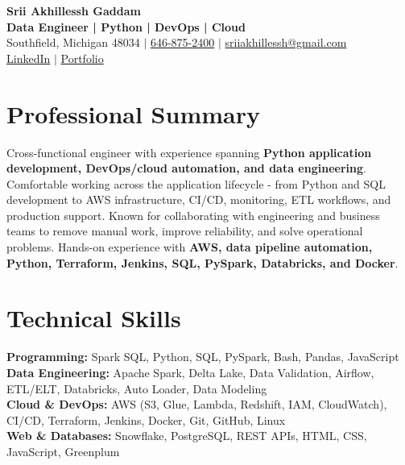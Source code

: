 \documentclass[letterpaper,10pt]{article}
\begin{document}
\fontsize{9.35pt}{10.45pt}\selectfont

\begin{center}
    {\LARGE \textbf{Srii Akhillessh Gaddam}} \\[-1pt]
    \textbf{Data Engineer | Python | DevOps | Cloud} \\[2pt]
    Southfield, Michigan 48034 $|$
    \href{tel:6468752400}{646-875-2400} $|$
    \href{mailto:sriiakhillessh@gmail.com}{sriiakhillessh@gmail.com} \\[1pt]
    \href{https://www.linkedin.com/in/srii-akhiilessh-gaddam-b48668191/}{LinkedIn} $|$
    \href{https://sriiakhillesshg.github.io/portfolio/}{Portfolio}
\end{center}
\vspace{-8pt}

\section{Professional Summary}
\small{Cross-functional engineer with experience spanning \textbf{Python application development, DevOps/cloud automation, and data engineering}. Comfortable working across the application lifecycle - from Python and SQL development to AWS infrastructure, CI/CD, monitoring, ETL workflows, and production support. Known for collaborating with engineering and business teams to remove manual work, improve reliability, and solve operational problems. Hands-on experience with \textbf{AWS, data pipeline automation, Python, Terraform, Jenkins, SQL, PySpark, Databricks, and Docker}.}

\section{Technical Skills}
\small{
\textbf{Programming:} Spark SQL, Python, SQL, PySpark, Bash, Pandas, JavaScript \\
\textbf{Data Engineering:} Apache Spark, Delta Lake, Data Validation, Airflow, ETL/ELT, Databricks, Auto Loader, Data Modeling \\
\textbf{Cloud \& DevOps:} AWS (S3, Glue, Lambda, Redshift, IAM, CloudWatch), CI/CD, Terraform, Jenkins, Docker, Git, GitHub, Linux \\
\textbf{Web \& Databases:} Snowflake, PostgreSQL, REST APIs, HTML, CSS, JavaScript, Greenplum
}

\end{document}
